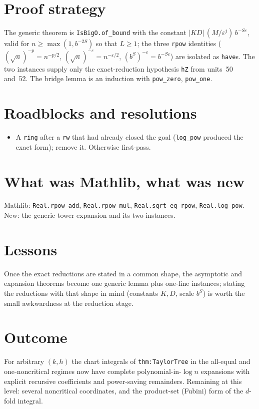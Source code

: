 \documentclass[11pt]{article}
\begin{document}
\section{Proof strategy}
The generic theorem is \texttt{IsBigO.of\_bound} with the constant $|KD|\,(M/\varepsilon^j)\,
b^{-S\varepsilon}$, valid for $n\ge\max(1,b^{-2S})$ so that $L\ge1$; the three \texttt{rpow}
identities ($(\sqrt n)^{-p}=n^{-p/2}$, $(\sqrt n)^{-\varepsilon}=n^{-\varepsilon/2}$,
$(b^S)^{-\varepsilon}=b^{-S\varepsilon}$) are isolated as \texttt{have}s. The two instances supply
only the exact-reduction hypothesis \texttt{hZ} from units~50 and~52. The bridge lemma is an
induction with \texttt{pow\_zero}, \texttt{pow\_one}.

\section{Roadblocks and resolutions}
\begin{itemize}
\item A \texttt{ring} after a \texttt{rw} that had already closed the goal (\texttt{log\_pow}
produced the exact form); remove it. Otherwise first-pass.
\end{itemize}

\section{What was Mathlib, what was new}
Mathlib: \texttt{Real.rpow\_add}, \texttt{Real.rpow\_mul}, \texttt{Real.sqrt\_eq\_rpow},
\texttt{Real.log\_pow}. New: the generic tower expansion and its two instances.

\section{Lessons}
Once the exact reductions are stated in a common shape, the asymptotic and expansion theorems become
one generic lemma plus one-line instances; stating the reductions with that shape in mind (constants
$K,D$, scale $b^S$) is worth the small awkwardness at the reduction stage.

\section{Outcome}
For arbitrary $(k,h)$ the chart integrals of \texttt{thm:TaylorTree} in the all-equal and one-noncritical
regimes now have complete polynomial-in-$\log n$ expansions with explicit recursive coefficients and
power-saving remainders. Remaining at this level: several noncritical coordinates, and the product-set
(Fubini) form of the $d$-fold integral.
\end{document}
